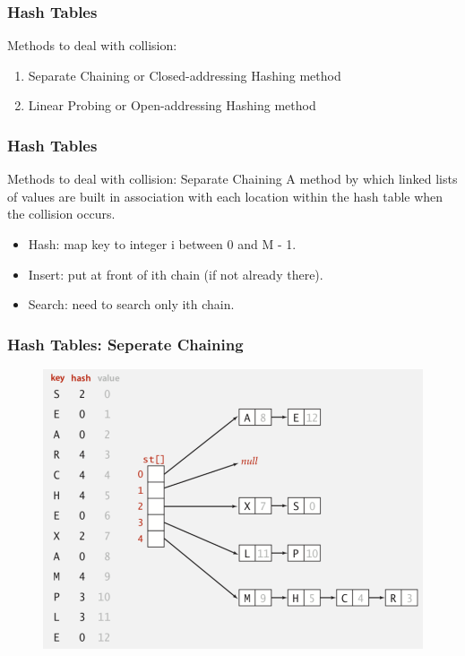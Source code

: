 \documentclass[11pt]{beamer}
\begin{document}
      \begin{frame}
     	\frametitle{Hash Tables}	
     	\begin{block}{Methods to deal with collision: }
     		\begin{enumerate}
     			\item Separate Chaining or Closed-addressing Hashing method
     		    \item Linear Probing or Open-addressing Hashing method
     		\end{enumerate}
     	\end{block}
     \end{frame}
 
      \begin{frame}
     	\frametitle{Hash Tables}	
     	\begin{block}{Methods to deal with collision:  Separate Chaining}
     		A method by which linked lists of values are built in association with each location within the hash table when the collision occurs.
     	\end{block}
         \begin{itemize}
         	\item Hash: map key to integer i between 0 and M - 1. 
         	\item Insert: put at front of ith chain (if not already there). 
         	\item Search: need to search only ith chain.
         \end{itemize}
        
        
     \end{frame}
    
          \begin{frame}
    	\frametitle{Hash Tables: Seperate Chaining}	
    	\begin{figure}
    		\centering
    		\includegraphics[width=1\linewidth]{"Screenshot 2020-11-29 at 9.06.41 AM"}
    		\label{fig:screenshot-2020-11-29-at-9}
    	\end{figure}
    	
    \end{frame}
 
\end{document}

